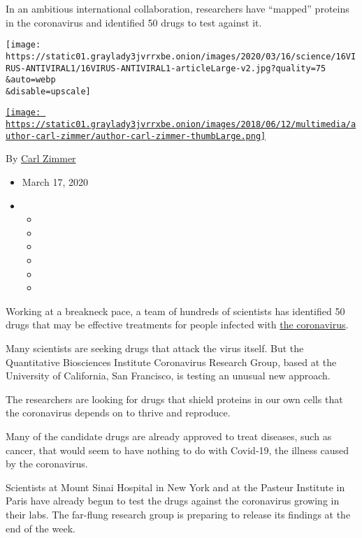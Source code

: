 In an ambitious international collaboration, researchers have ``mapped''
proteins in the coronavirus and identified 50 drugs to test against it.

\texttt{[image: https://static01.graylady3jvrrxbe.onion/images/2020/03/16/science/16VIRUS-ANTIVIRAL1/16VIRUS-ANTIVIRAL1-articleLarge-v2.jpg?quality=75\\\&auto=webp\\\&disable=upscale]}

\href{https://www.nytimes3xbfgragh.onion/by/carl-zimmer}{\texttt{[image: https://static01.graylady3jvrrxbe.onion/images/2018/06/12/multimedia/author-carl-zimmer/author-carl-zimmer-thumbLarge.png]}}

By \href{https://www.nytimes3xbfgragh.onion/by/carl-zimmer}{Carl Zimmer}

\begin{itemize}
\item
  March 17, 2020
\item
  \begin{itemize}
  \item
  \item
  \item
  \item
  \item
  \item
  \end{itemize}
\end{itemize}

Working at a breakneck pace, a team of hundreds of scientists has
identified 50 drugs that may be effective treatments for people infected
with
\href{https://www.nytimes3xbfgragh.onion/news-event/coronavirus}{the
coronavirus}.

Many scientists are seeking drugs that attack the virus itself. But the
Quantitative Biosciences Institute Coronavirus Research Group, based at
the University of California, San Francisco, is testing an unusual new
approach.

The researchers are looking for drugs that shield proteins in our own
cells that the coronavirus depends on to thrive and reproduce.

Many of the candidate drugs are already approved to treat diseases, such
as cancer, that would seem to have nothing to do with Covid-19, the
illness caused by the coronavirus.

Scientists at Mount Sinai Hospital in New York and at the Pasteur
Institute in Paris have already begun to test the drugs against the
coronavirus growing in their labs. The far-flung research group is
preparing to release its findings at the end of the week.

